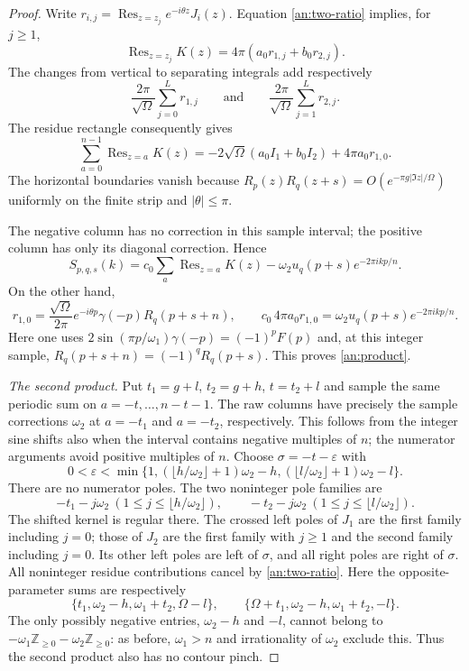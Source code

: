 \documentclass[11pt]{article}
\numberwithin{equation}{section}
\theoremstyle{definition}
\theoremstyle{remark}
\DeclareMathOperator{\Res}{Res}
\newcommand{\Z}{\mathbb Z}
\begin{document}
\begin{proof}
Write $r_{i,j}=\Res_{z=z_j}e^{-i\theta z}J_i(z)$.
Equation \eqref{an:two-ratio} implies, for $j\ge1$,
\[
 \Res_{z=z_j}K(z)=4\pi(a_0r_{1,j}+b_0r_{2,j}).
\]
The changes from vertical to separating integrals add respectively
\[
 \frac{2\pi}{\sqrt\Omega}\sum_{j=0}^Lr_{1,j}
 \qquad\text{and}\qquad
 \frac{2\pi}{\sqrt\Omega}\sum_{j=1}^Lr_{2,j}.
\]
The residue rectangle consequently gives
\begin{equation}
 \sum_{a=0}^{n-1}\Res_{z=a}K(z)
 =-2\sqrt\Omega(a_0I_1+b_0I_2)+4\pi a_0r_{1,0}.
 \label{an:rectangle}
\end{equation}
The horizontal boundaries vanish because
$R_p(z)R_q(z+s)=O(e^{-\pi g|\Im z|/\Omega})$ uniformly on the
finite strip and $|\theta|\le\pi$.

The negative column has no correction in this sample interval; the
positive column has only its diagonal correction.  Hence
\[
 S_{p,q,s}(k)=c_0\sum_a\Res_{z=a}K(z)
                    -\omega_2 u_q(p+s)e^{-2\pi ikp/n}.
\]
On the other hand,
\[
 r_{1,0}=\frac{\sqrt\Omega}{2\pi}e^{-i\theta p}
                 \gamma(-p)R_q(p+s+n),\qquad
 c_0\,4\pi a_0r_{1,0}=\omega_2 u_q(p+s)e^{-2\pi ikp/n}.
\]
Here one uses $2\sin(\pi p/\omega_1)\gamma(-p)=(-1)^pF(p)$ and,
at this integer sample, $R_q(p+s+n)=(-1)^qR_q(p+s)$.
This proves \eqref{an:product}.

\emph{The second product.}
Put $t_1=g+l$, $t_2=g+h$, $t=t_2+l$ and
sample the same periodic sum on $a=-t,\ldots,n-t-1$.
The raw columns have precisely the sample corrections $\omega_2$ at $a=-t_1$ and
$a=-t_2$, respectively.  This follows from the integer sine shifts
also when the interval contains negative multiples of $n$;
the numerator arguments avoid positive multiples of $n$.
Choose $\sigma=-t-\varepsilon$ with
\[
 0<\varepsilon<\min\{1,(\lfloor h/\omega_2\rfloor+1)\omega_2-h,
                         (\lfloor l/\omega_2\rfloor+1)\omega_2-l\}.
\]
There are no numerator poles.  The two noninteger pole families are
\[
 -t_1-j\omega_2\ (1\le j\le\lfloor h/\omega_2\rfloor),\qquad
 -t_2-j\omega_2\ (1\le j\le\lfloor l/\omega_2\rfloor).
\]
The shifted kernel is regular there.  The crossed left poles of
$J_1$ are the first family including $j=0$; those of $J_2$ are
the first family with $j\ge1$ and the second family including
$j=0$.  Its other left poles are left of $\sigma$, and all right
poles are right of $\sigma$.  All noninteger residue contributions
cancel by \eqref{an:two-ratio}.
Here the opposite-parameter sums are respectively
\[
 \{t_1,\omega_2-h,\omega_1+t_2,\Omega-l\},\qquad
 \{\Omega+t_1,\omega_2-h,\omega_1+t_2,-l\}.
\]
The only possibly negative entries, $\omega_2-h$ and $-l$, cannot
belong to $-\omega_1\Z_{\ge0}-\omega_2\Z_{\ge0}$: as before,
$\omega_1>n$ and irrationality of $\omega_2$ exclude this.  Thus the
second product also has no contour pinch.


\end{proof}
\end{document}
